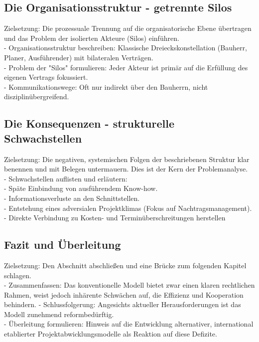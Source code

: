 \subsection{Die Organisationsstruktur - getrennte Silos}
\label{sec: 2.1.3}
Zielsetzung: Die prozessuale Trennung auf die organisatorische Ebene übertragen und das Problem der isolierten Akteure (Silos) einführen.\\
- Organisationsstruktur beschreiben: Klassische Dreieckskonstellation (Bauherr, Planer, Ausführender) mit bilateralen Verträgen.\\
- Problem der "Silos" formulieren: Jeder Akteur ist primär auf die Erfüllung des eigenen Vertrags fokussiert.\\
- Kommunikationswege: Oft nur indirekt über den Bauherrn, nicht disziplinübergreifend.\\

\subsection{Die Konsequenzen - strukturelle Schwachstellen}
\label{sec: 2.1.4}
Zielsetzung: Die negativen, systemischen Folgen der beschriebenen Struktur klar benennen und mit Belegen untermauern. Dies ist der Kern der Problemanalyse.\\
- Schwachstellen auflisten und erläutern:\\
- Späte Einbindung von ausführendem Know-how.\\
- Informationsverluste an den Schnittstellen.\\
- Entstehung eines adversialen Projektklimas (Fokus auf Nachtragsmanagement).\\
- Direkte Verbindung zu Kosten- und Terminüberschreitungen herstellen\\

\subsection{Fazit und Überleitung}
\label{sec: 2.1.5}
Zielsetzung: Den Abschnitt abschließen und eine Brücke zum folgenden Kapitel schlagen.\\

- Zusammenfassen: Das konventionelle Modell bietet zwar einen klaren rechtlichen Rahmen, weist jedoch inhärente Schwächen auf, die Effizienz und Kooperation behindern.
- Schlussfolgerung: Angesichts aktueller Herausforderungen ist das Modell zunehmend reformbedürftig.\\
- Überleitung formulieren: Hinweis auf die Entwicklung alternativer, international etablierter Projektabwicklungsmodelle als Reaktion auf diese Defizite.

